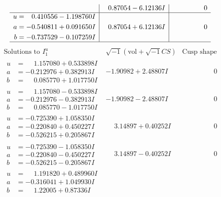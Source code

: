 \documentclass[1p]{elsarticle_modified}
\theoremstyle{definition}
\newcommand{\I}{\sqrt{-1}}
\begin{document}
$$\begin{array}{c|c|c}
 & \phantom{-}0.87054 - 6.12136 I & \phantom{-0.000000 } 0 \\ \hline\begin{aligned}
u &= \phantom{-}0.410556 - 1.198760 I \\
a &= -0.540811 + 0.091650 I \\
b &= -0.737529 - 0.107259 I\end{aligned}
 & \phantom{-}0.87054 + 6.12136 I & \phantom{-0.000000 } 0\\
 \hline 
 \end{array}$$\newpage$$\begin{array}{c|c|c}  
\text{Solutions to }I^u_{1}& \I (\text{vol} + \sqrt{-1}CS) & \text{Cusp shape}\\
 \hline 
\begin{aligned}
u &= \phantom{-}1.157080 + 0.533898 I \\
a &= -0.212976 + 0.382913 I \\
b &= \phantom{-}0.085770 + 1.017750 I\end{aligned}
 & -1.90982 + 2.48807 I & \phantom{-0.000000 } 0 \\ \hline\begin{aligned}
u &= \phantom{-}1.157080 - 0.533898 I \\
a &= -0.212976 - 0.382913 I \\
b &= \phantom{-}0.085770 - 1.017750 I\end{aligned}
 & -1.90982 - 2.48807 I & \phantom{-0.000000 } 0 \\ \hline\begin{aligned}
u &= -0.725390 + 1.058350 I \\
a &= -0.220840 + 0.450227 I \\
b &= -0.526215 + 0.205867 I\end{aligned}
 & \phantom{-}3.14897 + 0.40252 I & \phantom{-0.000000 } 0 \\ \hline\begin{aligned}
u &= -0.725390 - 1.058350 I \\
a &= -0.220840 - 0.450227 I \\
b &= -0.526215 - 0.205867 I\end{aligned}
 & \phantom{-}3.14897 - 0.40252 I & \phantom{-0.000000 } 0 \\ \hline\begin{aligned}
u &= \phantom{-}1.191820 + 0.489960 I \\
a &= -0.316041 + 1.049930 I \\
b &= \phantom{-}1.22005 + 0.87336 I\end{aligned}

\end{array}$$
\end{document}
